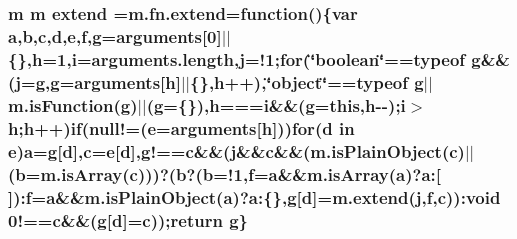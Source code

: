 \subsubsection[{extend}]{\setlength{\rightskip}{0pt plus 5cm}m m extend =m.\+fn.\+extend=function()\{var {\bf a},{\bf b},{\bf c},{\bf d},{\bf e},f,g=arguments\mbox{[}0\mbox{]}$\vert$$\vert$\{\},h=1,i=arguments.\+length,j=!1;for(\char`\"{}boolean\char`\"{}==typeof g\&\&(j=g,g=arguments\mbox{[}h\mbox{]}$\vert$$\vert$\{\},h++),\char`\"{}object\char`\"{}==typeof g$\vert$$\vert$m.\+is\+Function(g)$\vert$$\vert$(g=\{\}),h===i\&\&(g=this,h-\/-\/);i$>$h;h++){\bf if}(null!=({\bf e}=arguments\mbox{[}h\mbox{]}))for({\bf d} in {\bf e}){\bf a}=g\mbox{[}{\bf d}\mbox{]},{\bf c}={\bf e}\mbox{[}{\bf d}\mbox{]},g!=={\bf c}\&\&(j\&\&{\bf c}\&\&(m.\+is\+Plain\+Object({\bf c})$\vert$$\vert$({\bf b}=m.\+is\+Array({\bf c})))?({\bf b}?({\bf b}=!1,f={\bf a}\&\&m.\+is\+Array({\bf a})?a\+:\mbox{[}$\,$\mbox{]})\+:f={\bf a}\&\&m.\+is\+Plain\+Object({\bf a})?a\+:\{\},g\mbox{[}{\bf d}\mbox{]}=m.\+extend(j,f,{\bf c}))\+:void 0!=={\bf c}\&\&(g\mbox{[}{\bf d}\mbox{]}={\bf c}));return g\}}\label{application_2assets_2js_2jquery-1_811_82_8min_8js_a167947be5252c14d5389d8a01a8c8545}
\hypertarget{application_2assets_2js_2jquery-1_811_82_8min_8js_ab2836ee14921cbd6e34ea91a9a99ad66}{}

